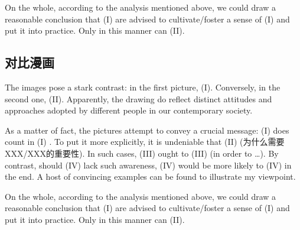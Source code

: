 On the whole, according to the analysis mentioned above, we could draw a reasonable 
conclusion that \textrm{(I)} are advised to cultivate/foster a sense of \textrm{(I)}
and put it into practice. Only in this manner can \textrm{(II)}.


\subsection{对比漫画}

The images pose a stark contrast:
in the first picture, \textrm{(I)}.
Conversely, in the second one, \textrm{(II)}.
Apparently, the drawing do reflect distinct attitudes and approaches 
adopted by different people in our contemporary society.

As a matter of fact, the pictures
attempt to convey a crucial message:
\textrm{(I)} does count in \textrm{(I)} .
To put it more explicitly, it is undeniable that 
\textrm{(II)} (为什么需要XXX/XXX的重要性).
In such cases, \textrm{(III)} ought to \textrm{(III)}
(in order to \dots).
By contrast, should \textrm{(IV)} lack such awareness, \textrm{(IV)}
would be more likely to \textrm{(IV)} in the end.
A host of convincing examples can be found to illustrate my viewpoint.

On the whole, according to the analysis mentioned above, we could draw a reasonable 
conclusion that \textrm{(I)} are advised to cultivate/foster a sense of \textrm{(I)}
and put it into practice. Only in this manner can \textrm{(II)}.
